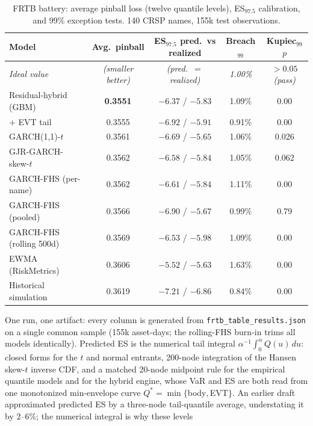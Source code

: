 \documentclass[11pt]{article}
\theoremstyle{remark}
\begin{document}
\begin{table}[t]
\centering
\begin{threeparttable}
\caption{FRTB battery: average pinball loss (twelve quantile levels),
ES$_{97.5}$ calibration, and 99\% exception tests. 140 CRSP names, 155k
test observations.}
\label{tab:frtb}
\small\setlength{\tabcolsep}{4.5pt}
\begin{tabular}{lcccc}
\toprule
Model & Avg.\ pinball & ES$_{97.5}$ pred.\ vs realized & Breach$_{99}$ & Kupiec$_{99}$ $p$ \\
\midrule
\emph{Ideal value} & \emph{(smaller better)} & \emph{(pred.\ $=$ realized)} & \emph{1.00\%} & \emph{$>0.05$ (pass)} \\
\midrule
Residual-hybrid (GBM) & \textbf{0.3551} & $-6.37$ / $-5.83$ & 1.09\% & 0.00 \\
\quad $+$ EVT tail & 0.3555 & $-6.92$ / $-5.91$ & 0.91\% & 0.00 \\
GARCH(1,1)-$t$ & 0.3561 & $-6.69$ / $-5.65$ & 1.06\% & 0.026 \\
GJR-GARCH-skew-$t$ & 0.3562 & $-6.58$ / $-5.84$ & 1.05\% & 0.062 \\
GARCH-FHS (per-name) & 0.3562 & $-6.61$ / $-5.84$ & 1.11\% & 0.00 \\
GARCH-FHS (pooled) & 0.3566 & $-6.90$ / $-5.67$ & 0.99\% & 0.79 \\
GARCH-FHS (rolling 500d) & 0.3569 & $-6.53$ / $-5.98$ & 1.09\% & 0.00 \\
EWMA (RiskMetrics) & 0.3606 & $-5.52$ / $-5.63$ & 1.63\% & 0.00 \\
Historical simulation & 0.3619 & $-7.21$ / $-6.86$ & 0.84\% & 0.00 \\
\bottomrule
\end{tabular}
\begin{tablenotes}\footnotesize
\item One run, one artifact: every column is generated from
\texttt{frtb\_table\_results.json} on a single common sample (155k
asset-days; the rolling-FHS burn-in trims all models identically).
Predicted ES is the numerical tail integral
$\alpha^{-1}\!\int_0^\alpha Q(u)\,du$: closed forms for the $t$ and
normal entrants, 200-node integration of the Hansen skew-$t$ inverse
CDF, and a matched 20-node midpoint rule for the empirical quantile
models and for the hybrid engine, whose VaR and ES are both read from
one monotonized min-envelope curve $Q^{*}=\min\{$body$,$EVT$\}$. An earlier draft
approximated predicted ES by a three-node tail-quantile average,
understating it by 2--6\%; the numerical integral is why these levels

\end{tablenotes}
\end{threeparttable}
\end{table}
\end{document}
